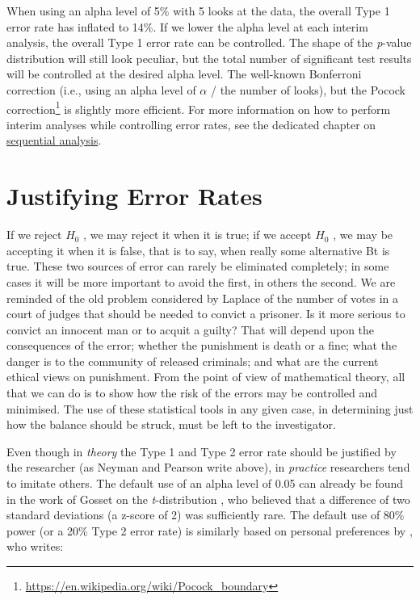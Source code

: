 \documentclass[
  oneside]{krantz}
\renewenvironment{quote}{\begin{VF}}{\end{VF}}
\renewcommand{\href}[2]{#2\footnote{\url{#1}}}
\begin{document}
When using an alpha level of 5\% with 5 looks at the data, the overall Type 1 error rate has inflated to 14\%. If we lower the alpha level at each interim analysis, the overall Type 1 error rate can be controlled. The shape of the \emph{p}-value distribution will still look peculiar, but the total number of significant test results will be controlled at the desired alpha level. The well-known Bonferroni correction (i.e., using an alpha level of \(\alpha\) / the number of looks), but the \href{https://en.wikipedia.org/wiki/Pocock_boundary}{Pocock correction} is slightly more efficient. For more information on how to perform interim analyses while controlling error rates, see the dedicated chapter on \protect\hyperlink{sequential}{sequential analysis}.

\hypertarget{justifyerrorrate}{%
\section{Justifying Error Rates}\label{justifyerrorrate}}

\begin{quote}
If we reject \(H_0\) , we may reject it when it is true; if we accept \(H_0\) , we may be accepting it when it is false, that is to say, when really some alternative Bt is true. These two sources of error can rarely be eliminated completely; in some cases it will be more important to avoid the first, in others the second. We are reminded of the old problem considered by Laplace of the number of votes in a court of judges that should be needed to convict a prisoner. Is it more serious to convict an innocent man or to acquit a guilty? That will depend upon the consequences of the error; whether the punishment is death or a fine; what the danger is to the community of released criminals; and what are the current ethical views on punishment. From the point of view of mathematical theory, all that we can do is to show how the risk of the errors may be controlled and minimised. The use of these statistical tools in any given case, in determining just how the balance should be struck, must be left to the investigator.
\end{quote}

Even though in \emph{theory} the Type 1 and Type 2 error rate should be justified by the researcher (as Neyman and Pearson \citeyearpar{neyman_problem_1933} write above), in \emph{practice} researchers tend to imitate others. The default use of an alpha level of 0.05 can already be found in the work of Gosset on the \emph{t}-distribution \citep{cowles_origins_1982, kennedy-shaffer_before_2019}, who believed that a difference of two standard deviations (a z-score of 2) was sufficiently rare. The default use of 80\% power (or a 20\% Type 2 error rate) is similarly based on personal preferences by \citet{cohen_statistical_1988}, who writes:
\end{document}

